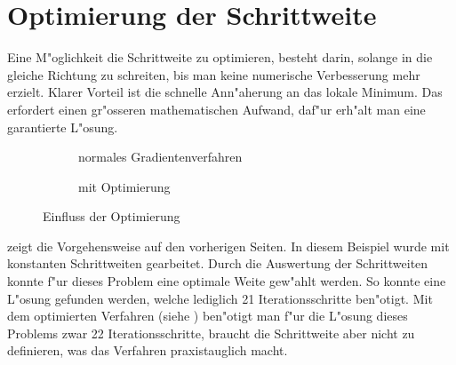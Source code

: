 \section{Optimierung der Schrittweite}
Eine M"oglichkeit die Schrittweite zu optimieren, besteht darin,
solange in die gleiche Richtung zu schreiten, bis man keine numerische
Verbesserung mehr erzielt.
Klarer Vorteil ist die schnelle Ann"aherung an das lokale Minimum.
Das erfordert einen gr"osseren mathematischen Aufwand, daf"ur erh"alt
man eine garantierte L"osung.

\begin{figure}[htb]
\centering
\begin{subfigure}[b]{0.49\textwidth}
\centering
\caption{normales Gradientenverfahren}\label{vergleich_a}
\end{subfigure} \begin{subfigure}[b]{0.49\textwidth}
\centering
\caption{mit Optimierung}\label{vergleich_b}
\end{subfigure}
\caption{Einfluss der Optimierung}
\end{figure}


 zeigt die Vorgehensweise auf den vorherigen
Seiten. In diesem Beispiel wurde mit konstanten Schrittweiten
gearbeitet. Durch die Auswertung der Schrittweiten konnte f"ur dieses
Problem eine optimale Weite gew"ahlt werden. So konnte eine L"osung
gefunden werden, welche lediglich 21 Iterationsschritte ben"otigt.
Mit dem optimierten Verfahren (siehe ) ben"otigt man
f"ur die L"osung dieses Problems zwar 22 Iterationsschritte, braucht die
Schrittweite aber nicht zu definieren, was das Verfahren praxistauglich
macht.
